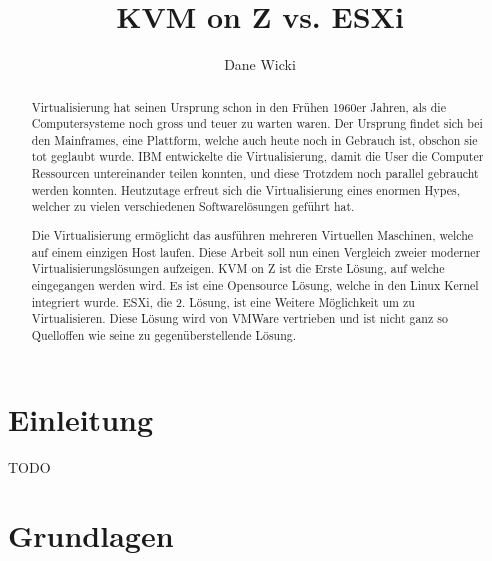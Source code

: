 \documentclass[14pt]{extreport}
\author{Dane Wicki}
\title{KVM on Z vs. ESXi}
\begin{document}
\maketitle

\begin{abstract}
Virtualisierung hat seinen Ursprung schon in den Frühen 1960er Jahren, als die Computersysteme noch gross und teuer zu warten waren. Der Ursprung findet sich bei den Mainframes, eine Plattform, welche auch heute noch in Gebrauch ist, obschon sie tot geglaubt wurde. IBM entwickelte die Virtualisierung, damit die User die Computer Ressourcen untereinander teilen konnten, und diese Trotzdem noch parallel gebraucht werden konnten. Heutzutage erfreut sich die Virtualisierung eines enormen Hypes, welcher zu vielen verschiedenen Softwarelösungen geführt hat.

Die Virtualisierung ermöglicht das ausführen mehreren Virtuellen Maschinen, welche auf einem einzigen Host laufen. Diese Arbeit soll nun einen Vergleich zweier moderner Virtualisierungslösungen aufzeigen. KVM on Z ist die Erste Lösung, auf welche eingegangen werden wird. Es ist eine Opensource Lösung, welche in den Linux Kernel integriert wurde. 
ESXi, die 2. Lösung, ist eine Weitere Möglichkeit um zu Virtualisieren. Diese Lösung wird von VMWare vertrieben und ist nicht ganz so Quelloffen wie seine zu gegenüberstellende Lösung.

\end{abstract}

\tableofcontents

\chapter{Einleitung}
TODO
\chapter{Grundlagen}
\end{document}
